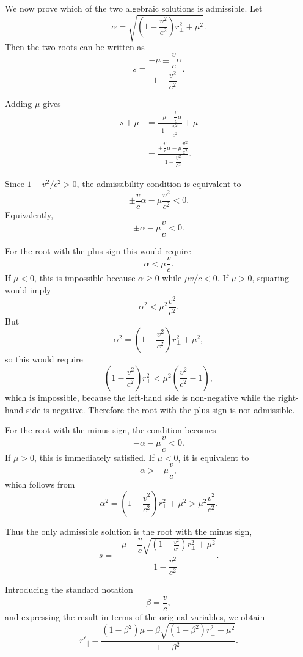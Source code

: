 \documentclass[12pt]{article}
\begin{document}
We now prove which of the two algebraic solutions is admissible.
Let
\[
  \alpha
  =
  \sqrt{
    \left(
      1-\frac{v^2}{c^2}
    \right)r_\perp^2
    +
    \mu^2
  }.
\]
Then the two roots can be written as
\[
  s
  =
  \frac{
    -\mu
    \pm
    \dfrac{v}{c}\alpha
  }{
    1-\dfrac{v^2}{c^2}
  }.
\]

Adding $\mu$ gives
\begin{align}
  s+\mu
  &=
  \frac{
    -\mu
    \pm
    \dfrac{v}{c}\alpha
  }{
    1-\dfrac{v^2}{c^2}
  }
  +
  \mu
  \\
  &=
  \frac{
    \pm\dfrac{v}{c}\alpha
    -
    \mu\dfrac{v^2}{c^2}
  }{
    1-\dfrac{v^2}{c^2}
  }.
\end{align}

Since $1-v^2/c^2>0$, the admissibility condition is equivalent to
\[
  \pm\frac{v}{c}\alpha
  -
  \mu\frac{v^2}{c^2}
  <
  0.
\]
Equivalently,
\[
  \pm\alpha
  -
  \mu\frac{v}{c}
  <
  0.
\]

For the root with the plus sign this would require
\[
  \alpha
  <
  \mu\frac{v}{c}.
\]
If $\mu<0$, this is impossible because $\alpha\ge0$ while
$\mu v/c<0$. If $\mu>0$, squaring would imply
\[
  \alpha^2
  <
  \mu^2\frac{v^2}{c^2}.
\]
But
\[
  \alpha^2
  =
  \left(
    1-\frac{v^2}{c^2}
  \right)r_\perp^2
  +
  \mu^2,
\]
so this would require
\[
  \left(
    1-\frac{v^2}{c^2}
  \right)r_\perp^2
  <
  \mu^2
  \left(
    \frac{v^2}{c^2}-1
  \right),
\]
which is impossible, because the left-hand side is non-negative while the
right-hand side is negative. Therefore the root with the plus sign is not
admissible.

For the root with the minus sign, the condition becomes
\[
  -\alpha
  -
  \mu\frac{v}{c}
  <
  0.
\]
If $\mu>0$, this is immediately satisfied. If $\mu<0$, it is
equivalent to
\[
  \alpha
  >
  -\mu\frac{v}{c},
\]
which follows from
\[
  \alpha^2
  =
  \left(
    1-\frac{v^2}{c^2}
  \right)r_\perp^2
  +
  \mu^2
  >
  \mu^2\frac{v^2}{c^2}.
\]

Thus the only admissible solution is the root with the minus sign,
\begin{equation}
  s
  =
  \frac{
    -\mu
    -
    \dfrac{v}{c}
    \sqrt{
      \left(
        1-\frac{v^2}{c^2}
      \right)r_\perp^2
      +
      \mu^2
    }
  }{
    1-\dfrac{v^2}{c^2}
  }.
  \label{eq:s_admissible_solution}
\end{equation}

 Introducing the standard notation
\[
  \beta=\frac{v}{c},
\]
and expressing the result in terms of the original variables, we obtain
\begin{equation}
  r'_\parallel
  =
  \frac{
    \left(1-\beta^2\right)\mu
    -
    \beta
    \sqrt{
      \left(1-\beta^2\right)r_\perp^2
      +
      \mu^2
    }
  }{
    1-\beta^2
  }.
  \label{eq:source_position_parallel_solution}
\end{equation}
\end{document}
